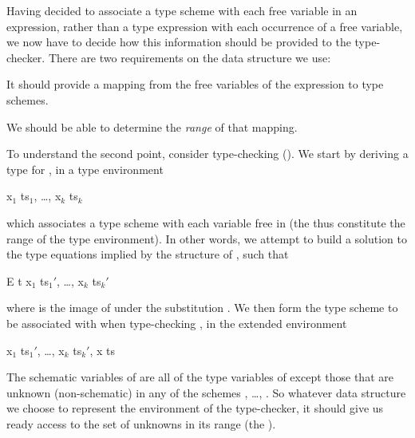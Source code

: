Having decided to associate a type scheme with each free variable in an
expression, rather than a type expression with each occurrence of a free
variable, we now have to decide how this information should be provided to
the type-checker. There are two requirements on the data structure we use:
\begin{numbered}
    \item It should provide a mapping from the free variables of the expression to
    type schemes.
    \item We should be able to determine the \textit{range} of that mapping.
\end{numbered}
To understand the second point, consider type-checking (). We
start by deriving a type  for , in a type environment
\begin{mlcoded}
x$_1$ \hastype{} ts$_1$, \; \ldots, \; x$_k$ \hastype{} ts$_k$
\end{mlcoded}
which associates a type scheme  with each variable  free in 
(the  thus constitute the range of the type environment). In other words, we attempt to
build a solution  to the type equations implied by the structure of , such
that
\begin{mlcoded}
    E \hastype{} t  \quad x$_1$ \hastype{} ts$_1'$, \ldots, x$_k$ \hastype{} ts$_k'$
\end{mlcoded}
where  is the image of  under the substitution . We then form the type
scheme  to be associated with  when type-checking , in the extended
environment
\begin{mlcoded}
    x$_1$ \hastype{} ts$_1'$, \ldots, x$_k$ \hastype{} ts$_k'$, x \hastype{} ts
\end{mlcoded}
The schematic variables of  are all of the type variables of  except those that
are unknown (non-schematic) in any of the schemes , \ldots, . So
whatever data structure we choose to represent the environment of the
type-checker, it should give us ready access to the set of unknowns in its range
(the ).

